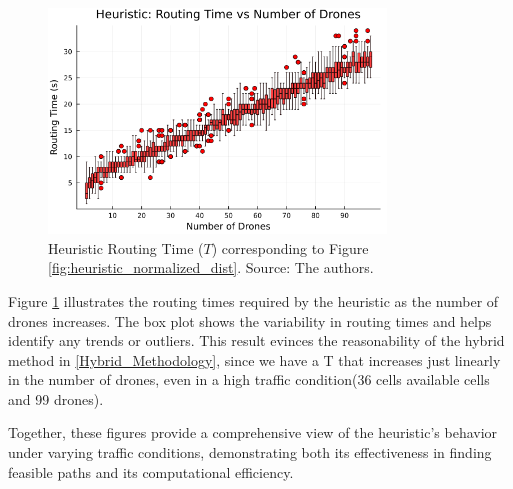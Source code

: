 \begin{figure}[H]
    \centering
    \includegraphics[width=0.8\textwidth]{img/cpp_routing_time_boxplot_vs_drones.png}
    \caption{Heuristic Routing Time ($T$) corresponding to Figure \ref{fig:heuristic_normalized_dist}. Source: The authors.}
    \label{fig:heuristic_normalized_routing_time}
\end{figure}

Figure \ref{fig:heuristic_normalized_routing_time} illustrates the routing times required by the heuristic as the number of drones increases. The box plot shows the variability in routing times and helps identify any trends or outliers. This result evinces the reasonability of the hybrid method in \ref{Hybrid_Methodology}, since we have a T that increases just linearly in the number of drones, even in a high traffic condition(36 cells available cells and 99 drones).

Together, these figures provide a comprehensive view of the heuristic's behavior under varying traffic conditions, demonstrating both its effectiveness in finding feasible paths and its computational efficiency. 